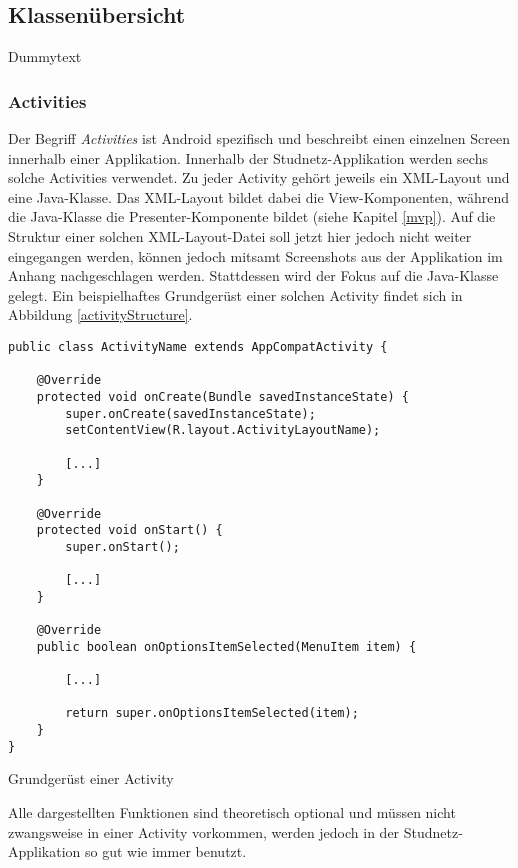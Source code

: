 \documentclass[../main.tex]{subfiles}
\begin{document}
	\subsection{Klassenübersicht}
	Dummytext
	
	\subsubsection{Activities} \label{activities}
	Der Begriff \emph{Activities} ist Android spezifisch und beschreibt einen einzelnen Screen innerhalb einer Applikation. Innerhalb der Studnetz-Applikation werden sechs solche Activities verwendet. Zu jeder Activity gehört jeweils ein XML-Layout und eine Java-Klasse. Das XML-Layout bildet dabei die View-Komponenten, während die Java-Klasse die Presenter-Komponente bildet (siehe Kapitel \ref{mvp}). Auf die Struktur einer solchen XML-Layout-Datei soll jetzt hier jedoch nicht weiter eingegangen werden, können jedoch mitsamt Screenshots aus der Applikation im Anhang nachgeschlagen werden. Stattdessen wird der Fokus auf die Java-Klasse gelegt. Ein beispielhaftes Grundgerüst einer solchen Activity findet sich in Abbildung \ref{activityStructure}.
	
\begin{code}
	\begin{center}
		\begin{verbatim}
public class ActivityName extends AppCompatActivity {
			
	@Override
	protected void onCreate(Bundle savedInstanceState) {
		super.onCreate(savedInstanceState);
		setContentView(R.layout.ActivityLayoutName);
		
		[...]	
	}
	
	@Override
	protected void onStart() {
		super.onStart();
		
		[...]
	}
	
	@Override
	public boolean onOptionsItemSelected(MenuItem item) {
		
		[...]
		
		return super.onOptionsItemSelected(item);
	}
}	
		\end{verbatim}
	\end{center}
	\caption{Grundgerüst einer Activity} \label{activityStructure}
\end{code}

	Alle dargestellten Funktionen sind theoretisch optional und müssen nicht zwangsweise in einer Activity vorkommen, werden jedoch in der Studnetz-Applikation so gut wie immer benutzt.
\end{document}
